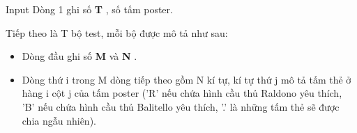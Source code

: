 Input
Dòng 1 ghi số \textbf{ T } , số tấm poster.

Tiếp theo là T bộ test, mỗi bộ được mô tả như sau:
\begin{itemize}
	\item Dòng đầu ghi số \textbf{ M } và \textbf{ N } .
\end{itemize}
\begin{itemize}
	\item Dòng thứ i trong M dòng tiếp theo gồm N kí tự, kí tự thứ j mô tả tấm thẻ ở hàng i cột j của tấm poster ('R' nếu chứa hình cầu thủ Raldono yêu thích, 'B' nếu chứa hình cầu thủ Balitello yêu thích, '.' là những tấm thẻ sẽ được chia ngẫu nhiên).
\end{itemize}